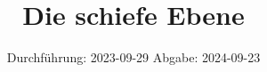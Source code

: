 
\usepackage{tikz}

\subject{V16516}
\title{Die schiefe Ebene}
\date{%
  Durchführung: 2023-09-29
  \hspace{3em}
  Abgabe: 2024-09-23
}



\maketitle
\thispagestyle{empty}
\tableofcontents
\newpage






\printbibliography{}


